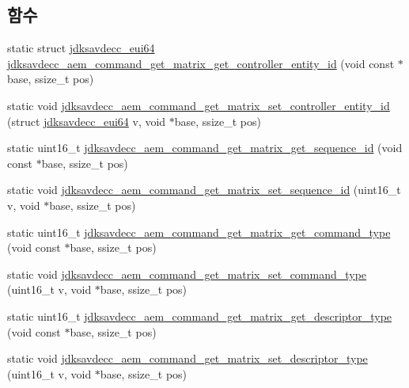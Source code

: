 \subsection*{함수}
\begin{DoxyCompactItemize}
\item 
static struct \hyperlink{structjdksavdecc__eui64}{jdksavdecc\+\_\+eui64} \hyperlink{group__command__get__matrix_ga385d5abe1681b78eb029e0c68e8fd4d3}{jdksavdecc\+\_\+aem\+\_\+command\+\_\+get\+\_\+matrix\+\_\+get\+\_\+controller\+\_\+entity\+\_\+id} (void const $\ast$base, ssize\+\_\+t pos)
\item 
static void \hyperlink{group__command__get__matrix_gab06b864aa8f1ef37700ccee2b75bf22f}{jdksavdecc\+\_\+aem\+\_\+command\+\_\+get\+\_\+matrix\+\_\+set\+\_\+controller\+\_\+entity\+\_\+id} (struct \hyperlink{structjdksavdecc__eui64}{jdksavdecc\+\_\+eui64} v, void $\ast$base, ssize\+\_\+t pos)
\item 
static uint16\+\_\+t \hyperlink{group__command__get__matrix_ga6d395a37a06c2ff9e972599efd9a6341}{jdksavdecc\+\_\+aem\+\_\+command\+\_\+get\+\_\+matrix\+\_\+get\+\_\+sequence\+\_\+id} (void const $\ast$base, ssize\+\_\+t pos)
\item 
static void \hyperlink{group__command__get__matrix_ga792754dda997e02c71c61867d92fc79b}{jdksavdecc\+\_\+aem\+\_\+command\+\_\+get\+\_\+matrix\+\_\+set\+\_\+sequence\+\_\+id} (uint16\+\_\+t v, void $\ast$base, ssize\+\_\+t pos)
\item 
static uint16\+\_\+t \hyperlink{group__command__get__matrix_gadf0baf48872054c42069592524df3f42}{jdksavdecc\+\_\+aem\+\_\+command\+\_\+get\+\_\+matrix\+\_\+get\+\_\+command\+\_\+type} (void const $\ast$base, ssize\+\_\+t pos)
\item 
static void \hyperlink{group__command__get__matrix_gab34904d4a31475a7374c7128ad44bfef}{jdksavdecc\+\_\+aem\+\_\+command\+\_\+get\+\_\+matrix\+\_\+set\+\_\+command\+\_\+type} (uint16\+\_\+t v, void $\ast$base, ssize\+\_\+t pos)
\item 
static uint16\+\_\+t \hyperlink{group__command__get__matrix_gadecbe0ab8669b005acd23a62a0d4d077}{jdksavdecc\+\_\+aem\+\_\+command\+\_\+get\+\_\+matrix\+\_\+get\+\_\+descriptor\+\_\+type} (void const $\ast$base, ssize\+\_\+t pos)
\item 
static void \hyperlink{group__command__get__matrix_ga3586ff90411e0e3c6e8153e59ae312c8}{jdksavdecc\+\_\+aem\+\_\+command\+\_\+get\+\_\+matrix\+\_\+set\+\_\+descriptor\+\_\+type} (uint16\+\_\+t v, void $\ast$base, ssize\+\_\+t pos)
\item 

\end{DoxyCompactItemize}
